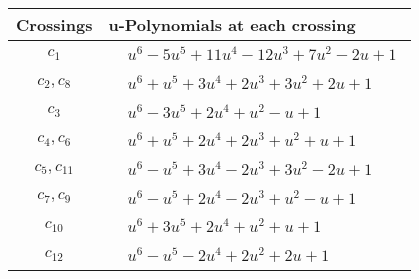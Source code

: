 \documentclass[1p]{elsarticle_modified}
\theoremstyle{definition}
\begin{document}
\begin{tabular}{m{50pt}|m{274pt}}
Crossings & \hspace{64pt}u-Polynomials at each crossing \\
\hline $$\begin{aligned}c_{1}\end{aligned}$$&$\begin{aligned}
&u^6-5 u^5+11 u^4-12 u^3+7 u^2-2 u+1
\end{aligned}$\\
\hline $$\begin{aligned}c_{2},c_{8}\end{aligned}$$&$\begin{aligned}
&u^6+u^5+3 u^4+2 u^3+3 u^2+2 u+1
\end{aligned}$\\
\hline $$\begin{aligned}c_{3}\end{aligned}$$&$\begin{aligned}
&u^6-3 u^5+2 u^4+u^2- u+1
\end{aligned}$\\
\hline $$\begin{aligned}c_{4},c_{6}\end{aligned}$$&$\begin{aligned}
&u^6+u^5+2 u^4+2 u^3+u^2+u+1
\end{aligned}$\\
\hline $$\begin{aligned}c_{5},c_{11}\end{aligned}$$&$\begin{aligned}
&u^6- u^5+3 u^4-2 u^3+3 u^2-2 u+1
\end{aligned}$\\
\hline $$\begin{aligned}c_{7},c_{9}\end{aligned}$$&$\begin{aligned}
&u^6- u^5+2 u^4-2 u^3+u^2- u+1
\end{aligned}$\\
\hline $$\begin{aligned}c_{10}\end{aligned}$$&$\begin{aligned}
&u^6+3 u^5+2 u^4+u^2+u+1
\end{aligned}$\\
\hline $$\begin{aligned}c_{12}\end{aligned}$$&$\begin{aligned}
&u^6- u^5-2 u^4+2 u^2+2 u+1
\end{aligned}$\\
\hline
\end{tabular}\\~\\
\end{document}
